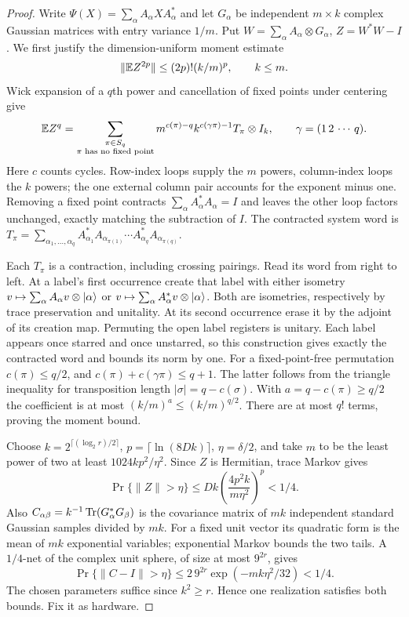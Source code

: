 \begin{proof}
Write $\Psi(X)=\sum_\alpha A_\alpha X A_\alpha^*$ and let
$G_\alpha$ be independent $m\times k$ complex Gaussian matrices
with entry variance $1/m$. Put $W=\sum_\alpha A_\alpha\otimes G_\alpha$,
$Z=W^*W-I$. We first justify the dimension-uniform moment estimate
\[
 \|\mathbb E Z^{2p}\|\leq(2p)!(k/m)^p,\qquad k\leq m.
\]
Wick expansion of a $q$th power and cancellation of fixed points
under centering give
\[
 \mathbb E Z^q=\sum_{\substack{\pi\in S_q\\\pi\text{ has no fixed point}}}
  m^{c(\pi)-q}k^{c(\gamma\pi)-1}T_\pi\otimes I_k,
 \qquad \gamma=(1\,2\,\cdots\,q).
\]
Here $c$ counts cycles. Row-index loops supply the $m$ powers,
column-index loops the $k$ powers; the one external column pair
accounts for the exponent minus one. Removing a fixed point
contracts $\sum_\alpha A_\alpha^*A_\alpha=I$ and leaves the other
loop factors unchanged, exactly matching the subtraction of $I$.
The contracted system word is
$T_\pi=\sum_{\alpha_1,\ldots,\alpha_q}
 A_{\alpha_1}^*A_{\alpha_{\pi(1)}}\cdots
 A_{\alpha_q}^*A_{\alpha_{\pi(q)}}$.

Each $T_\pi$ is a contraction, including crossing pairings.
Read its word from right to left. At a label's first occurrence create
that label with either isometry
$v\mapsto\sum_\alpha A_\alpha v\otimes\lvert \alpha\rangle$ or
$v\mapsto\sum_\alpha A_\alpha^*v\otimes\lvert \alpha\rangle$.
Both are isometries, respectively by trace preservation and unitality.
At its second occurrence erase it by the adjoint of its creation map.
Permuting the open label registers is unitary. Each label appears
once starred and once unstarred, so this construction gives exactly
the contracted word and bounds its norm by one.
For a fixed-point-free permutation $c(\pi)\leq q/2$, and
$c(\pi)+c(\gamma\pi)\leq q+1$. The latter follows from the triangle
inequality for transposition length $|\sigma|=q-c(\sigma)$.
With $a=q-c(\pi)\geq q/2$ the coefficient is at most
$(k/m)^a\leq(k/m)^{q/2}$. There are at most $q!$ terms, proving
the moment bound.

Choose $k=2^{\lceil(\log_2r)/2\rceil}$,
$p=\lceil\ln(8Dk)\rceil$, $\eta=\delta/2$, and take $m$ to be
the least power of two at least $1024kp^2/\eta^2$.
Since $Z$ is Hermitian, trace Markov gives
\[
 \Pr\{\|Z\|>\eta\}\leq
 Dk\left(\frac{4p^2k}{m\eta^2}\right)^p<1/4.
\]
Also $C_{\alpha\beta}=k^{-1}\operatorname{Tr}(G_\alpha^*G_\beta)$ is the
covariance matrix of $mk$ independent standard Gaussian samples
divided by $mk$. For a fixed unit vector its quadratic form is the
mean of $mk$ exponential variables; exponential Markov bounds the
two tails. A $1/4$-net of the complex unit sphere, of size at most
$9^{2r}$, gives
\[
 \Pr\{\|C-I\|>\eta\}
 \leq2\,9^{2r}\exp(-mk\eta^2/32)<1/4.
\]
The chosen parameters suffice since $k^2\geq r$.
Hence one realization satisfies both bounds. Fix it as hardware.


\end{proof}
